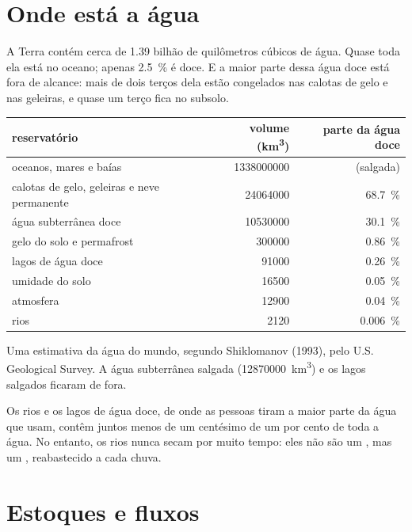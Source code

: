 \section{Onde está a água}

A Terra contém cerca de 1.39 bilhão de quilômetros cúbicos de água. Quase
toda ela está no oceano; apenas \qty{2.5}{\percent} é doce. E a maior parte
dessa água doce está fora de alcance: mais de dois terços dela estão
congelados nas calotas de gelo e nas geleiras, e quase um terço fica no
subsolo.

\begin{center}
\small
\begin{tabular}{|l|r|r|}
\hline
\textbf{reservatório} & \textbf{volume (\unit{km^3})} & \textbf{parte da água doce} \\ \hline
oceanos, mares e baías & \num{1338000000} & (salgada) \\ \hline
calotas de gelo, geleiras e neve permanente & \num{24064000} & \qty{68.7}{\percent} \\ \hline
água subterrânea doce & \num{10530000} & \qty{30.1}{\percent} \\ \hline
gelo do solo e permafrost & \num{300000} & \qty{0.86}{\percent} \\ \hline
lagos de água doce & \num{91000} & \qty{0.26}{\percent} \\ \hline
umidade do solo & \num{16500} & \qty{0.05}{\percent} \\ \hline
atmosfera & \num{12900} & \qty{0.04}{\percent} \\ \hline
rios & \num{2120} & \qty{0.006}{\percent} \\ \hline
\end{tabular}

{\small Uma estimativa da água do mundo, segundo Shiklomanov (1993), pelo
U.S. Geological Survey. A água subterrânea salgada (\num{12870000}~\unit{km^3})
e os lagos salgados ficaram de fora.}
\end{center}

Os rios e os lagos de água doce, de onde as pessoas tiram a maior parte da
água que usam, contêm juntos menos de um centésimo de um por cento de toda a
água. No entanto, os rios nunca secam por muito tempo: eles não são um
, mas um , reabastecido a cada chuva.

\section{Estoques e fluxos}

